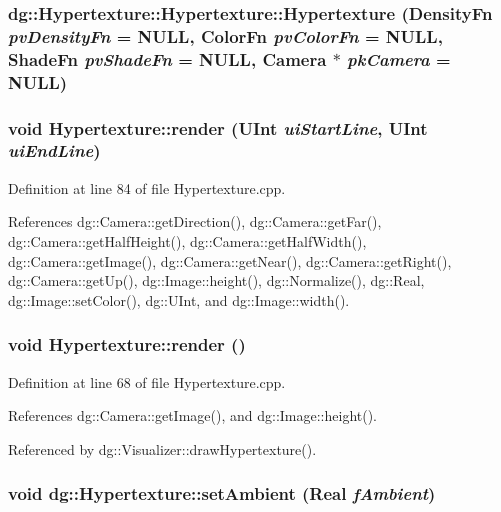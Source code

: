 \subsubsection{\setlength{\rightskip}{0pt plus 5cm}dg::Hypertexture::Hypertexture::Hypertexture ({\bf Density\-Fn} {\em pv\-Density\-Fn} = NULL, {\bf Color\-Fn} {\em pv\-Color\-Fn} = NULL, {\bf Shade\-Fn} {\em pv\-Shade\-Fn} = NULL, {\bf Camera} $\ast$ {\em pk\-Camera} = NULL)}\label{classdg_1_1Hypertexture_a0}


\subsubsection{\setlength{\rightskip}{0pt plus 5cm}void Hypertexture::render ({\bf UInt} {\em ui\-Start\-Line}, {\bf UInt} {\em ui\-End\-Line})}\label{classdg_1_1Hypertexture_a50}




Definition at line 84 of file Hypertexture.cpp.

References dg::Camera::get\-Direction(), dg::Camera::get\-Far(), dg::Camera::get\-Half\-Height(), dg::Camera::get\-Half\-Width(), dg::Camera::get\-Image(), dg::Camera::get\-Near(), dg::Camera::get\-Right(), dg::Camera::get\-Up(), dg::Image::height(), dg::Normalize(), dg::Real, dg::Image::set\-Color(), dg::UInt, and dg::Image::width().
\subsubsection{\setlength{\rightskip}{0pt plus 5cm}void Hypertexture::render ()}\label{classdg_1_1Hypertexture_a49}




Definition at line 68 of file Hypertexture.cpp.

References dg::Camera::get\-Image(), and dg::Image::height().

Referenced by dg::Visualizer::draw\-Hypertexture().
\subsubsection{\setlength{\rightskip}{0pt plus 5cm}void dg::Hypertexture::set\-Ambient ({\bf Real} {\em f\-Ambient})\hspace{0.3cm}{\tt  [inline]}}\label{classdg_1_1Hypertexture_a16}




